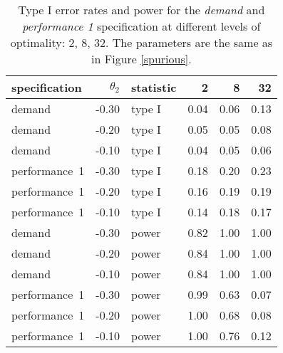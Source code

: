 \begin{table}[ht]
\centering
\begingroup\footnotesize
\begin{tabular}{lrlrrr}
  \hline
specification & $\theta_2$ & statistic & 2 & 8 & 32 \\ 
  \hline
demand & -0.30 & type I & 0.04 & 0.06 & 0.13 \\ 
  demand & -0.20 & type I & 0.05 & 0.05 & 0.08 \\ 
  demand & -0.10 & type I & 0.04 & 0.05 & 0.06 \\ 
  performance~1 & -0.30 & type I & 0.18 & 0.20 & 0.23 \\ 
  performance~1 & -0.20 & type I & 0.16 & 0.19 & 0.19 \\ 
  performance~1 & -0.10 & type I & 0.14 & 0.18 & 0.17 \\ 
  demand & -0.30 & power & 0.82 & 1.00 & 1.00 \\ 
  demand & -0.20 & power & 0.84 & 1.00 & 1.00 \\ 
  demand & -0.10 & power & 0.84 & 1.00 & 1.00 \\ 
  performance~1 & -0.30 & power & 0.99 & 0.63 & 0.07 \\ 
  performance~1 & -0.20 & power & 1.00 & 0.68 & 0.08 \\ 
  performance~1 & -0.10 & power & 1.00 & 0.76 & 0.12 \\ 
   \hline
\end{tabular}
\endgroup
\caption{Type I error rates and power for the \emph{demand} and
             \emph{performance 1} specification at different levels of 
             optimality: 2, 8, 32. The parameters are the same as in Figure 
             \ref{spurious}.} 
\label{main-table}
\end{table}
